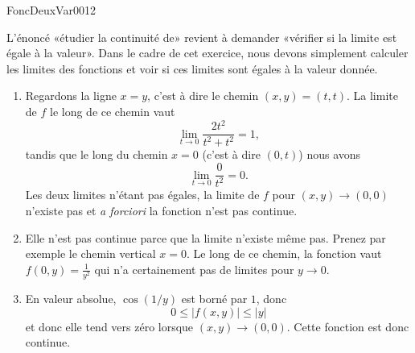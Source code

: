 

\begin{corrige}{FoncDeuxVar0012}

	L'énoncé «étudier la continuité de» revient à demander «vérifier si la limite est égale à la valeur». Dans le cadre de cet exercice, nous devons simplement calculer les limites des fonctions et voir si ces limites sont égales à la valeur donnée.

	\begin{enumerate}

		\item
			Regardons la ligne $x=y$, c'est à dire le chemin $(x,y)=(t,t)$. La limite de $f$ le long de ce chemin vaut
			\begin{equation}
				\lim_{t\to 0}\frac{ 2t^2 }{ t^2+t^2 }=1,
			\end{equation}
			tandis que le long du chemin $x=0$ (c'est à dire $(0,t)$) nous avons
			\begin{equation}
				\lim_{t\to 0}\frac{ 0 }{ t^2 }=0.
			\end{equation}
			Les deux limites n'étant pas égales, la limite de $f$ pour $(x,y)\to (0,0)$ n'existe pas et \emph{a forciori} la fonction n'est pas continue.
		\item
			Elle n'est pas continue parce que la limite n'existe même pas. Prenez par exemple le chemin vertical $x=0$. Le long de ce chemin, la fonction vaut $f(0,y)=\frac{1}{ y^2 }$ qui n'a certainement pas de limites pour $y\to 0$.

		\item
			En valeur absolue, $\cos(1/y)$ est borné par $1$, donc 
			\begin{equation}
				0\leq | f(x,y) |\leq | y |
			\end{equation}
			et donc elle tend vers zéro lorsque $(x,y)\to(0,0)$. Cette fonction est donc continue.

	\end{enumerate}

\end{corrige}
